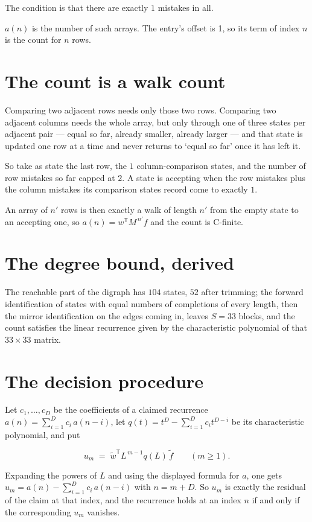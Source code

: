 \documentclass[11pt]{article}
\theoremstyle{definition}
\begin{document}
The condition is that there are exactly $1$ mistakes in all.

$a(n)$ is the number of such arrays. The entry's offset is 1, so its term of index $n$ is the count for $n$ rows.

\section{The count is a walk count}

Comparing two adjacent rows needs only those two rows. Comparing two adjacent columns needs the whole array, but only through one of three states per adjacent pair --- equal so far, already smaller, already larger --- and that state is updated one row at a time and never returns to `equal so far' once it has left it.

So take as state the last row, the $1$ column-comparison states, and the number of row mistakes so far capped at $2$. A state is accepting when the row mistakes plus the column mistakes its comparison states record come to exactly $1$.

An array of $n'$ rows is then exactly a walk of length $n'$ from the empty state to an accepting one, so $a(n) = w^{\mathsf T}M^{\,n'}f$ and the count is C-finite.

\section{The degree bound, derived}

The reachable part of the digraph has $104$ states, $52$ after trimming; the forward identification of states with equal numbers of completions of every length, then the mirror identification on the edges coming in, leaves $S = 33$ blocks, and the count satisfies the linear recurrence given by the characteristic polynomial of that $33\times33$ matrix.

\section{The decision procedure}

Let $c_1,\dots,c_D$ be the coefficients of a claimed recurrence $a(n) = \sum_{i=1}^{D} c_i\,a(n-i)$, let $q(t) = t^{D} - \sum_{i=1}^{D} c_i t^{D-i}$ be its characteristic polynomial, and put

\[u_m \;=\; \tilde w^{\mathsf T} L^{\,m-1} q(L)\,\tilde f \qquad (m \ge 1).\]

Expanding the powers of $L$ and using the displayed formula for $a$, one gets $u_m = a(n) - \sum_{i=1}^{D} c_i\,a(n-i)$ with $n = m + D$. So $u_m$ is exactly the residual of the claim at that index, and the recurrence holds at an index $n$ if and only if the corresponding $u_m$ vanishes.
\end{document}
